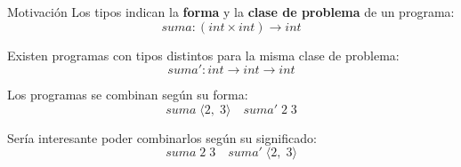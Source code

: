 \iffalse
\begin{frame}{Correspondencia de Curry-Howard}
	\begin{itemize}[<+->]
		\item Tipos $\Leftrightarrow$ Proposiciones
			\begin{itemize}[<+->]
				\item $A \times B \Leftrightarrow A \wedge B$
				\item $A \rightarrow B \Leftrightarrow A \Rightarrow B$
				\item $\top \Leftrightarrow true$
			\end{itemize}
		\item Programas $\Leftrightarrow$ Pruebas
		
		\centering
		\begin{prooftree}
			\hypo{\Gamma \ni x:A}
			\infer1[($ax$)]{ \Gamma \vdash x:A }
			\hypo{\Gamma \ni y:A}
			\infer1[($ax$)]{ \Gamma \vdash y:B }
			\infer2[($\times_i$)]{ \Gamma \vdash \langle x, y \rangle : A \times B }
		\end{prooftree}
		\quad
		\begin{prooftree}
			\infer0{\Gamma, A \vdash A}
			\infer0{\Gamma, B \vdash B}
			\infer2[$\wedge_i$]{ \Gamma \vdash A \wedge B }
		\end{prooftree}
		
		\item Evaluación $\Leftrightarrow$ Simplificación
		
		\begin{center}
			\begin{prooftree}
				\hypo{[A]}
				\hypo{[B]}
				\infer2[$\wedge_i$]{ \Gamma \vdash A \wedge B }
				\infer1[$\wedge_{e_1}$]{ \Gamma \vdash A }
			\end{prooftree}
			$\quad\Rightarrow\quad [A]$ 
		\end{center}
	\end{itemize}
\end{frame}
\fi

\begin{frame}{Motivación}
	Los tipos indican la \textbf{forma} y la \textbf{clase de problema} de un programa:
	\pause
	\[ suma : (int \times int) \rightarrow int \]
	
	\pause
	Existen programas con tipos distintos para la misma clase de problema:
	\[ suma' : int \rightarrow int \rightarrow int \]
	
	\pause
	Los programas se combinan según su forma:
	\[ suma \;\langle2,\; 3\rangle \quad suma'\; 2\; 3 \]
	
	\pause
	Sería interesante poder combinarlos según su significado:
	\[ suma\; 2\; 3 \quad suma' \;\langle2,\; 3\rangle \]
\end{frame}

